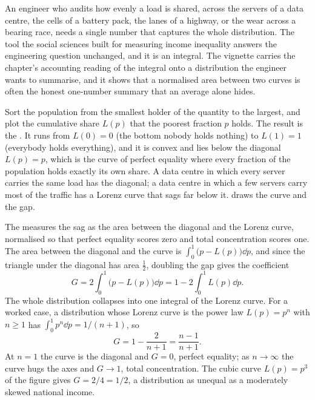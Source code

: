 An engineer who audits how evenly a load is shared, across the servers of
a data centre, the cells of a battery pack, the lanes of a highway, or the
wear across a bearing race, needs a single number that captures the whole
distribution. The tool the social sciences built for measuring income
inequality answers the engineering question unchanged, and it is an
integral. The vignette carries the chapter's accounting reading of the
integral onto a distribution the engineer wants to summarise, and it shows
that a normalised area between two curves is often the honest one-number
summary that an average alone hides.

Sort the population from the smallest holder of the quantity to the
largest, and plot the cumulative share $L(p)$ that the poorest fraction
$p$ holds. The result is the . It runs from
$L(0) = 0$ (the bottom nobody holds nothing) to $L(1) = 1$ (everybody
holds everything), and it is convex and lies below the diagonal $L(p) = p$,
which is the curve of perfect equality where every fraction of the
population holds exactly its own share. A data centre in which every
server carries the same load has the diagonal; a data centre in which a
few servers carry most of the traffic has a Lorenz curve that sags far
below it.  draws the curve and the gap.

The  measures the sag as the area between the
diagonal and the Lorenz curve, normalised so that perfect equality scores
zero and total concentration scores one. The area between the diagonal and
the curve is $\int_{0}^{1}\bigl(p - L(p)\bigr)\dd p$, and since the
triangle under the diagonal has area $\tfrac{1}{2}$, doubling the gap
gives the coefficient
\[
G = 2\int_{0}^{1}\bigl(p - L(p)\bigr)\dd p = 1 - 2\int_{0}^{1} L(p)\dd p.
\]
The whole distribution collapses into one integral of the Lorenz curve.
For a worked case, a distribution whose Lorenz curve is the power law
$L(p) = p^{n}$ with $n \geq 1$ has $\int_{0}^{1} p^{n}\dd p = 1/(n+1)$, so
\[
G = 1 - \frac{2}{n+1} = \frac{n-1}{n+1}.
\]
At $n = 1$ the curve is the diagonal and $G = 0$, perfect equality; as
$n \to \infty$ the curve hugs the axes and $G \to 1$, total concentration.
The cubic curve $L(p) = p^{3}$ of the figure gives $G = 2/4 = 1/2$, a
distribution as unequal as a moderately skewed national income.

